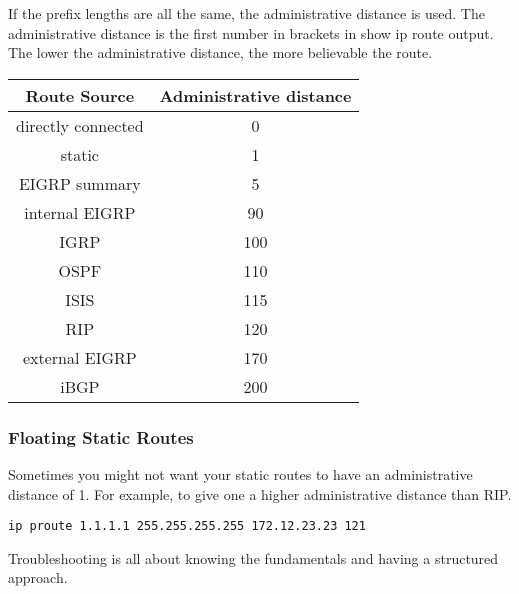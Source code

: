 If the prefix lengths are all the same, the administrative distance is used.
The administrative distance is the first number in brackets in show ip route
output. The lower the administrative distance, the more believable the
route.\\

\begin{tabular}{ | c | c | }
\hline
Route Source & Administrative distance \\ \hline
directly connected &   0 \\ \hline
static             &   1 \\ \hline
EIGRP summary      &   5 \\ \hline
internal EIGRP     &  90 \\ \hline
IGRP               & 100 \\ \hline
OSPF               & 110 \\ \hline
ISIS               & 115 \\ \hline
RIP                & 120 \\ \hline
external EIGRP     & 170 \\ \hline
iBGP               & 200 \\ \hline
\end{tabular}

\subsubsection{Floating Static Routes}

Sometimes you might not want your static routes to have an administrative
distance of 1. For example, to give one a higher administrative distance than
RIP.

\begin{verbatim}
ip proute 1.1.1.1 255.255.255.255 172.12.23.23 121
\end{verbatim}

Troubleshooting is all about knowing the fundamentals and having a structured
approach.
